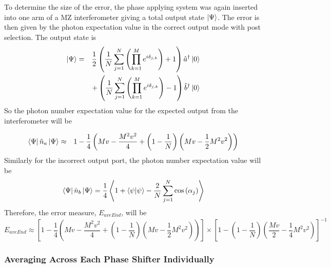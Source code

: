 \documentclass[aps,pra,twocolumn,superscriptaddress,numerical,floatfix]{revtex4-1}
\begin{document}
To determine the size of the error, the phase applying system was again inserted into one arm of a MZ interferometer giving a total output state $\ket{\Psi}$. The error is then given by the photon expectation value in the correct output mode with post selection. The output state is
\begin{eqnarray}
	\ket{\Psi}& = &\frac{1}{2}\left(\frac{1}{N}\sum_{j=1}^{N}\left(\prod_{k=1}^{M}e^{i\delta_{j,k}}\right)+1\right)\hat{a}^{\dagger}\ket{0}\\ & & +\left(\frac{1}{N}\sum_{j=1}^{N}\left(\prod_{k=1}^{M}e^{i\delta_{j,k}}\right)-1\right)\hat{b}^{\dagger}\ket{0}\label{eq:AveEndIntState}
\end{eqnarray}
So the photon number expectation value for the expected output from the interferometer will be
\begin{widetext}
\begin{eqnarray}
	\bra{\Psi}\hat{n}_{a}\ket{\Psi}
& \approx & 1-\frac{1}{4}\left(Mv-\frac{M^{2}v^{2}}{4}+\left(1-\frac{1}{N}\right)\left(Mv-\frac{1}{2}M^{2}v^{2}\right)\right)
\end{eqnarray}
Similarly for the incorrect output port, the photon number expectation value will be
\begin{equation}
	\bra{\Psi}\hat{n}_{b}\ket{\Psi} = \frac{1}{4}\left\langle 1+\left\langle \psi|\psi\right\rangle -\frac{2}{N}\sum_{j=1}^{N}\cos\left(\alpha_{j}\right)\right\rangle 
\end{equation}
Therefore, the error measure, $E_{aveEnd}$, will be
\begin{equation}
E_{aveEnd}  \approx  \left[1-\frac{1}{4}\left(Mv-\frac{M^{2}v^{2}}{4}+\left(1-\frac{1}{N}\right)\left(Mv-\frac{1}{2}M^{2}v^{2}\right)\right)\right]\nonumber\times\left[1-\left(1-\frac{1}{N}\right)\left(\frac{Mv}{2}-\frac{1}{4}M^{2}v^{2}\right)\right]^{-1}\label{eq:ErrorAvEnd}
\end{equation}
\end{widetext}

\subsubsection{Averaging Across Each Phase Shifter Individually\label{Averaging Across Each Phase Shifter Individually}}
\end{document}
